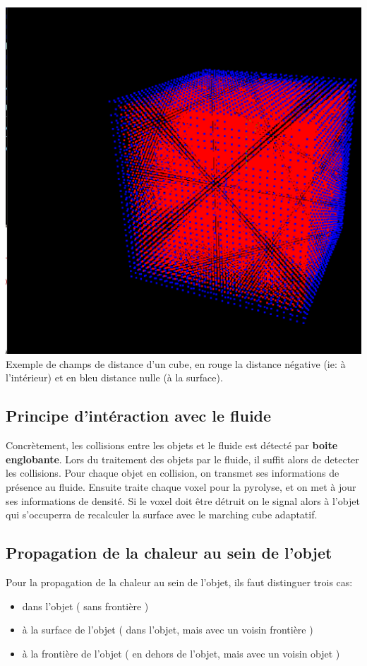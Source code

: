 \documentclass[a4paper,10pt]{article}
\begin{document}
\begin{center}
  \includegraphics[scale=0.5]{phi_inside.ps}\\ Exemple de champs de
  distance d'un cube, en rouge la distance négative (ie: à
  l'intérieur) et en bleu distance nulle (à la surface).
\end{center}

\subsection{Principe d'intéraction avec le fluide}
Concrètement, les collisions entre les objets et le fluide est détecté
par \textbf{boite englobante}. Lors du traitement des objets par le
fluide, il suffit alors de detecter les collisions. Pour chaque objet
en collision, on transmet ses informations de présence au
fluide. Ensuite traite chaque voxel pour la pyrolyse, et on met à jour
ses informations de densité. Si le voxel doit être détruit on le
signal alors à l'objet qui s'occuperra de recalculer la surface avec
le marching cube adaptatif.

\subsection{Propagation de la chaleur au sein de l'objet}
Pour la propagation de la chaleur au sein de l'objet, ils faut distinguer trois cas:
\begin{itemize}
\item dans l'objet ( sans frontière )
\item à la surface de l'objet ( dans l'objet, mais avec un voisin frontière )
\item à la frontière de l'objet ( en dehors de l'objet, mais avec un voisin objet )
\end{itemize}
\end{document}
